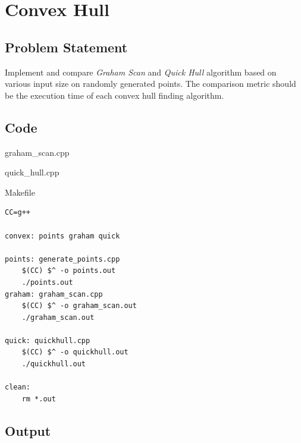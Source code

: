 \section{Convex Hull}
\subsection{Problem Statement}
Implement and compare \textit{Graham Scan} and \textit{Quick Hull} algorithm based on
various input size on randomly generated points.
The comparison metric should be the execution time of each convex hull
finding algorithm.
\subsection{Code}
\begin{code}
    \caption{graham\_scan.cpp}
    \label{code:graham}
\end{code}

\begin{code}
    \caption{quick\_hull.cpp}
    \label{code:quickhull}
\end{code}

\begin{code}
    \caption{Makefile}
    \begin{verbatim}
CC=g++

convex: points graham quick

points: generate_points.cpp
	$(CC) $^ -o points.out
	./points.out
graham:	graham_scan.cpp
	$(CC) $^ -o graham_scan.out
	./graham_scan.out

quick: quickhull.cpp
	$(CC) $^ -o quickhull.out
	./quickhull.out

clean:
	rm *.out
    \end{verbatim}
\end{code}

\subsection{Output}

